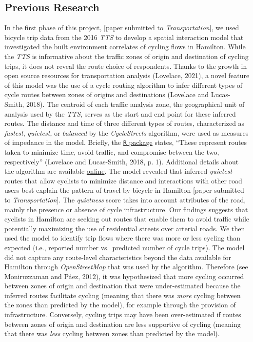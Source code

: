 \documentclass[]{elsarticle} %
\begin{document}
\hypertarget{previous-research}{%
\subsection{Previous Research}\label{previous-research}}

In the first phase of this project, {[}paper submitted to
\emph{Transportation}{]}, we used bicycle trip data from the 2016
\emph{TTS} to develop a spatial interaction model that investigated the
built environment correlates of cycling flows in Hamilton. While the
\emph{TTS} is informative about the traffic zones of origin and
destination of cycling trips, it does not reveal the route choice of
respondents. Thanks to the growth in open source resources for
transportation analysis (Lovelace, 2021), a novel feature of this model
was the use of a cycle routing algorithm to infer different types of
cycle routes between zones of origins and destinations (Lovelace and
Lucas-Smith, 2018). The centroid of each traffic analysis zone, the
geographical unit of analysis used by the \emph{TTS}, serves as the
start and end point for these inferred routes. The distance and time of
three different types of routes, characterized as \emph{fastest},
\emph{quietest}, or \emph{balanced} by the \emph{CycleStreets}
algorithm, were used as measures of impedance in the model. Briefly, the
\href{https://cran.r-project.org/web/packages/cyclestreets/index.html}{\texttt{R}
package} states, ``These represent routes taken to minimize time, avoid
traffic, and compromise between the two, respectively'' (Lovelace and
Lucas-Smith, 2018, p. 1). Additional details about the algorithm are
available
\href{https://www.cyclestreets.net/help/journey/howitworks/}{online}.
The model revealed that inferred \emph{quietest} routes that allow
cyclists to minimize distance and interactions with other road users
best explain the pattern of travel by bicycle in Hamilton {[}paper
submitted to \emph{Transportation}{]}. The \emph{quietness} score takes
into account attributes of the road, mainly the presence or absence of
cycle infrastructure. Our findings suggests that cyclists in Hamilton
are seeking out routes that enable them to avoid traffic while
potentially maximizing the use of residential streets over arterial
roads. We then used the model to identify trip flows where there was
more or less cycling than expected (i.e., reported number vs.~predicted
number of cycle trips). The model did not capture any route-level
characteristics beyond the data available for Hamilton through
\emph{OpenStreetMap} that was used by the algorithm. Therefore (see
Moniruzzaman and Páez, 2012), it was hypothesized that more cycling
occurred between zones of origin and destination that were
under-estimated because the inferred routes facilitate cycling (meaning
that there was \emph{more} cycling between the zones than predicted by
the model), for example through the provision of infrastructure.
Conversely, cycling trips may have been over-estimated if routes between
zones of origin and destination are less supportive of cycling (meaning
that there was \emph{less} cycling between zones than predicted by the
model).
\end{document}
